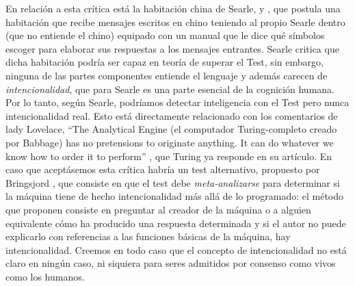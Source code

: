 \documentclass[12pt]{memoir}
\begin{document}
En relación a esta crítica está la habitación china de Searle, \parencite{searleChineseRoom} y \parencite[apartado 4.2]{afterTuring}, que postula una habitación que recibe mensajes escritos en chino teniendo al propio Searle dentro (que no entiende el chino) equipado con un manual que le dice qué símbolos escoger para elaborar sus respuestas a los mensajes entrantes. Searle critica que dicha habitación podría ser capaz en teoría de superar el Test, sin embargo, ninguna de las partes componentes entiende el lenguaje y además carecen de \textit{intencionalidad}, que para Searle es una parte esencial de la cognición humana. Por lo tanto, según Searle, podríamos detectar inteligencia con el Test pero nunca intencionalidad real. Esto está directamente relacionado con los comentarios de lady Lovelace, ``The Analytical Engine (el computador Turing-completo creado por Babbage) has no pretensions to originate anything. It can do whatever we know how to order it to perform'' \parencite[apartado 2.6]{sep-turing-test}, que Turing ya responde en su artículo. En caso que aceptásemos esta crítica habría un test alternativo, propuesto por Bringsjord \parencite[apartado 5.3.2]{sep-turing-test}, que consiste en que el test debe \textit{meta-analizarse} para determinar si la máquina tiene de hecho intencionalidad más allá de lo programado: el método que proponen consiste en preguntar al creador de la máquina o a alguien equivalente cómo ha producido una respuesta determinada y si el autor no puede explicarlo con referencias a las funciones básicas de la máquina, hay intencionalidad. Creemos en todo caso que el concepto de intencionalidad no está claro en ningún caso, ni siquiera para seres admitidos por consenso como vivos como los humanos.
\end{document}
